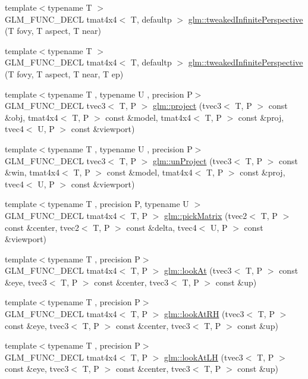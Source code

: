 \begin{DoxyCompactItemize}
\item 
{\footnotesize template$<$typename T $>$ }\\G\+L\+M\+\_\+\+F\+U\+N\+C\+\_\+\+D\+E\+C\+L tmat4x4$<$ T, defaultp $>$ \hyperlink{group__gtc__matrix__transform_gaed64bd81f5ecdab52fecbdf7f6b58194}{glm\+::tweaked\+Infinite\+Perspective} (T fovy, T aspect, T near)
\item 
{\footnotesize template$<$typename T $>$ }\\G\+L\+M\+\_\+\+F\+U\+N\+C\+\_\+\+D\+E\+C\+L tmat4x4$<$ T, defaultp $>$ \hyperlink{group__gtc__matrix__transform_gaa50fce7f50b5d5da881ed30f5532a921}{glm\+::tweaked\+Infinite\+Perspective} (T fovy, T aspect, T near, T ep)
\item 
{\footnotesize template$<$typename T , typename U , precision P$>$ }\\G\+L\+M\+\_\+\+F\+U\+N\+C\+\_\+\+D\+E\+C\+L tvec3$<$ T, P $>$ \hyperlink{group__gtc__matrix__transform_gad743556abd138264d4f06f4ca27f1d7e}{glm\+::project} (tvec3$<$ T, P $>$ const \&obj, tmat4x4$<$ T, P $>$ const \&model, tmat4x4$<$ T, P $>$ const \&proj, tvec4$<$ U, P $>$ const \&viewport)
\item 
{\footnotesize template$<$typename T , typename U , precision P$>$ }\\G\+L\+M\+\_\+\+F\+U\+N\+C\+\_\+\+D\+E\+C\+L tvec3$<$ T, P $>$ \hyperlink{group__gtc__matrix__transform_ga82a558de3ce42cbeed0f6ec292a4e1b3}{glm\+::un\+Project} (tvec3$<$ T, P $>$ const \&win, tmat4x4$<$ T, P $>$ const \&model, tmat4x4$<$ T, P $>$ const \&proj, tvec4$<$ U, P $>$ const \&viewport)
\item 
{\footnotesize template$<$typename T , precision P, typename U $>$ }\\G\+L\+M\+\_\+\+F\+U\+N\+C\+\_\+\+D\+E\+C\+L tmat4x4$<$ T, P $>$ \hyperlink{group__gtc__matrix__transform_ga9026c77505b99990f68826f27c267dc5}{glm\+::pick\+Matrix} (tvec2$<$ T, P $>$ const \&center, tvec2$<$ T, P $>$ const \&delta, tvec4$<$ U, P $>$ const \&viewport)
\item 
{\footnotesize template$<$typename T , precision P$>$ }\\G\+L\+M\+\_\+\+F\+U\+N\+C\+\_\+\+D\+E\+C\+L tmat4x4$<$ T, P $>$ \hyperlink{group__gtc__matrix__transform_gaf8eef81da1ad09f6a8920101c01eaae4}{glm\+::look\+At} (tvec3$<$ T, P $>$ const \&eye, tvec3$<$ T, P $>$ const \&center, tvec3$<$ T, P $>$ const \&up)
\item 
{\footnotesize template$<$typename T , precision P$>$ }\\G\+L\+M\+\_\+\+F\+U\+N\+C\+\_\+\+D\+E\+C\+L tmat4x4$<$ T, P $>$ \hyperlink{group__gtc__matrix__transform_ga2876d9313334980b94292d2ec169088e}{glm\+::look\+At\+R\+H} (tvec3$<$ T, P $>$ const \&eye, tvec3$<$ T, P $>$ const \&center, tvec3$<$ T, P $>$ const \&up)
\item 
{\footnotesize template$<$typename T , precision P$>$ }\\G\+L\+M\+\_\+\+F\+U\+N\+C\+\_\+\+D\+E\+C\+L tmat4x4$<$ T, P $>$ \hyperlink{group__gtc__matrix__transform_gacd0c077ec7b58a575855e29cb5fb586d}{glm\+::look\+At\+L\+H} (tvec3$<$ T, P $>$ const \&eye, tvec3$<$ T, P $>$ const \&center, tvec3$<$ T, P $>$ const \&up)
\end{DoxyCompactItemize}


